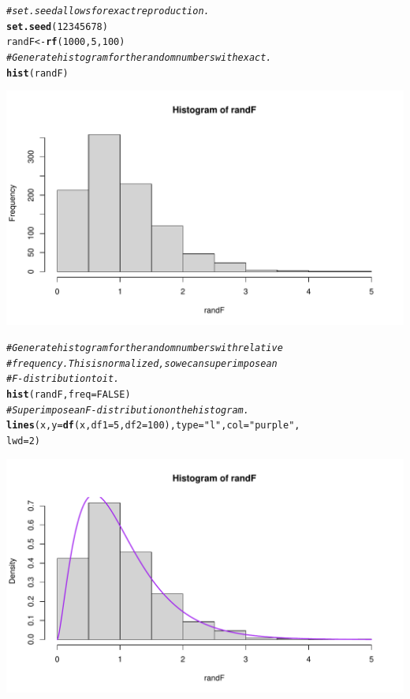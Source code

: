 \documentclass[oneside]{book}\usepackage[]{graphicx}\usepackage[dvipsnames,table,xcdraw]{xcolor}
\makeatletter
\def\maxwidth{ %
  \ifdim\Gin@nat@width>\linewidth
    \linewidth
  \else
    \Gin@nat@width
  \fi
}
\newcommand{\hlnum}[1]{\textcolor[rgb]{0.686,0.059,0.569}{#1}}%
\newcommand{\hlstr}[1]{\textcolor[rgb]{0.192,0.494,0.8}{#1}}%
\newcommand{\hlcom}[1]{\textcolor[rgb]{0.678,0.584,0.686}{\textit{#1}}}%
\newcommand{\hlstd}[1]{\textcolor[rgb]{0.345,0.345,0.345}{#1}}%
\newcommand{\hlkwb}[1]{\textcolor[rgb]{0.69,0.353,0.396}{#1}}%
\newcommand{\hlkwc}[1]{\textcolor[rgb]{0.333,0.667,0.333}{#1}}%
\newcommand{\hlkwd}[1]{\textcolor[rgb]{0.737,0.353,0.396}{\textbf{#1}}}%
\newenvironment{kframe}{%
 \def\at@end@of@kframe{}%
 \ifinner\ifhmode%
  \def\at@end@of@kframe{\end{minipage}}%
  \begin{minipage}{\columnwidth}%
 \fi\fi%
 \def\FrameCommand##1{\hskip\@totalleftmargin \hskip-\fboxsep
 \colorbox{shadecolor}{##1}\hskip-\fboxsep
     \hskip-\linewidth \hskip-\@totalleftmargin \hskip\columnwidth}%
 \MakeFramed {\advance\hsize-\width
   \@totalleftmargin\z@ \linewidth\hsize
   \@setminipage}}%
 {\par\unskip\endMakeFramed%
 \at@end@of@kframe}
\newenvironment{knitrout}{}{} %
\makeatother
\begin{document}
\begin{knitrout}
\color{fgcolor}\begin{kframe}
\begin{alltt}
\hlcom{# set.seed allows for exact reproduction.}
\hlkwd{set.seed}\hlstd{(}\hlnum{12345678}\hlstd{)}
\hlstd{randF} \hlkwb{<-} \hlkwd{rf}\hlstd{(}\hlnum{1000}\hlstd{,} \hlnum{5}\hlstd{,} \hlnum{100}\hlstd{)}
\hlcom{# Generate histogram for the random numbers with exact.}
\hlkwd{hist}\hlstd{(randF)}
\end{alltt}
\end{kframe}

{\centering \includegraphics[width=\maxwidth]{figure/unnamed-chunk-35-1} 

}


\begin{kframe}\begin{alltt}
\hlcom{# Generate histogram for the random numbers with relative}
\hlcom{# frequency.  This is normalized, so we can superimpose an}
\hlcom{# F-distribution to it.}
\hlkwd{hist}\hlstd{(randF,} \hlkwc{freq} \hlstd{=} \hlnum{FALSE}\hlstd{)}
\hlcom{# Superimpose an F-distribution on the histogram.}
\hlkwd{lines}\hlstd{(x,} \hlkwc{y} \hlstd{=} \hlkwd{df}\hlstd{(x,} \hlkwc{df1} \hlstd{=} \hlnum{5}\hlstd{,} \hlkwc{df2} \hlstd{=} \hlnum{100}\hlstd{),} \hlkwc{type} \hlstd{=} \hlstr{"l"}\hlstd{,} \hlkwc{col} \hlstd{=} \hlstr{"purple"}\hlstd{,}
  \hlkwc{lwd} \hlstd{=} \hlnum{2}\hlstd{)}
\end{alltt}
\end{kframe}

{\centering \includegraphics[width=\maxwidth]{figure/unnamed-chunk-35-2} 

}
\end{knitrout}
\end{document}
